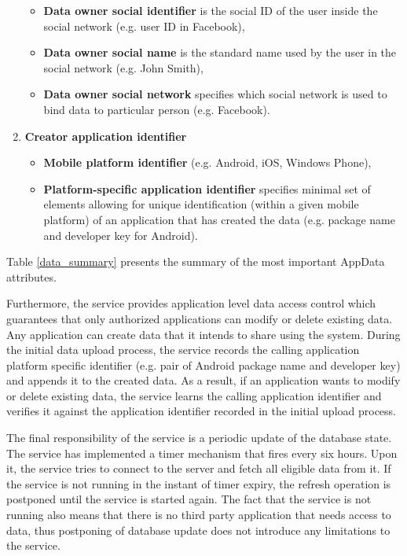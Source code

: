 \documentclass[twocolumn,a4paper,10pt]{article}
\begin{document}
\begin{enumerate}
\begin{itemize}
\item \textbf{Data owner social identifier} is the social ID of the user inside the social network (e.g. user ID in Facebook),
\item \textbf{Data owner social name} is the standard name used by the user in the social network (e.g. John Smith),
\item \textbf{Data owner social network} specifies which social network is used to bind data to particular person (e.g. Facebook).
\end{itemize}
\item \textbf{Creator application identifier}
\begin{itemize}
\item \textbf{Mobile platform identifier} (e.g. Android, iOS, Windows Phone),
\item \textbf{Platform-specific application identifier} specifies minimal set of elements allowing for unique identification (within a given mobile platform) of an application that has created the data (e.g. package name and developer key for Android).
\end{itemize}
\end{enumerate}
Table \ref{data_summary} presents the summary of the most important AppData attributes.

Furthermore, the service provides application level data access control which guarantees that only authorized applications can modify or delete existing data. Any application can create data that it intends to share using the system. During the initial data upload process, the service records the calling application platform specific identifier (e.g. pair of Android package name and developer key) and appends it to the created data. As a result, if an application wants to modify or delete existing data, the service learns the calling application identifier and verifies it against the application identifier recorded in the initial upload process. 

The final responsibility of the service is a periodic update of the database state. The service has implemented a timer mechanism that fires every six hours. Upon it, the service tries to connect to the server and fetch all eligible data from it. If the service is not running in the instant of timer expiry, the refresh operation is postponed until the service is started again. The fact that the service is not running also means that there is no third party application that needs access to data, thus postponing of database update does not introduce any limitations to the service. 
\end{document}
